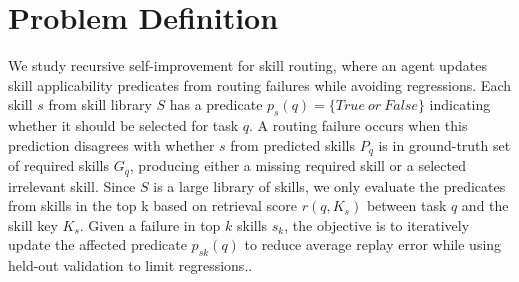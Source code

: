 
\section{Problem Definition}

We study recursive self-improvement for skill routing, where an agent updates skill applicability predicates from routing failures while avoiding regressions. Each skill \(s\) from skill library \(S\) has a predicate \(p_{s}(q) = \{ True\ or\ False\}\) indicating whether it should be selected for task \(q\). A routing failure occurs when this prediction disagrees with whether \(s\) from predicted skills \(P_{q}\) is in ground-truth set of required skills \(G_{q}\), producing either a missing required skill or a selected irrelevant skill. Since \(S\) is a large library of skills, we only evaluate the predicates from skills in the top k based on retrieval score \(r(q,K_{s})\) between task \(q\) and the skill key \(K_{s}\). Given a failure in top \(k\) skills \(s_{k}\), the objective is to iteratively update the affected predicate \(p_{sk}(q)\) to reduce average replay error while using held-out validation to limit regressions..
